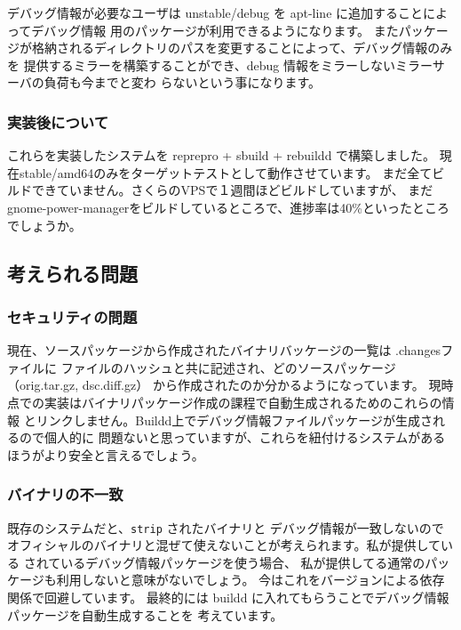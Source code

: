 \documentclass[mingoth,a4paper]{jsarticle}
\begin{document}
デバッグ情報が必要なユーザは unstable/debug を apt-line に追加することによってデバッグ情報
用のパッケージが利用できるようになります。
またパッケージが格納されるディレクトリのパスを変更することによって、デバッグ情報のみを
提供するミラーを構築することができ、debug 情報をミラーしないミラーサーバの負荷も今までと変わ
らないという事になります。

\subsubsection{実装後について}

これらを実装したシステムを reprepro + sbuild + rebuildd で構築しました。
現在stable/amd64のみをターゲットテストとして動作させています。
まだ全てビルドできていません。さくらのVPSで１週間ほどビルドしていますが、
まだgnome-power-managerをビルドしているところで、進捗率は40\%といったところでしょうか。

\subsection{考えられる問題}

\subsubsection{セキュリティの問題}
現在、ソースパッケージから作成されたバイナリバッケージの一覧は .changesファイルに
ファイルのハッシュと共に記述され、どのソースパッケージ（orig.tar.gz, dsc.diff.gz）
から作成されたのか分かるようになっています。
現時点での実装はバイナリパッケージ作成の課程で自動生成されるためのこれらの情報
とリンクしません。Buildd上でデバッグ情報ファイルパッケージが生成されるので個人的に
問題ないと思っていますが、これらを紐付けるシステムがあるほうがより安全と言えるでしょう。

\subsubsection{バイナリの不一致}
既存のシステムだと、\texttt{strip} されたバイナリと デバッグ情報が一致しないので
オフィシャルのバイナリと混ぜて使えないことが考えられます。私が提供している
されているデバッグ情報パッケージを使う場合、
私が提供してる通常のパッケージも利用しないと意味がないでしょう。
今はこれをバージョンによる依存関係で回避しています。
最終的には buildd に入れてもらうことでデバッグ情報パッケージを自動生成することを
考えています。
\end{document}
